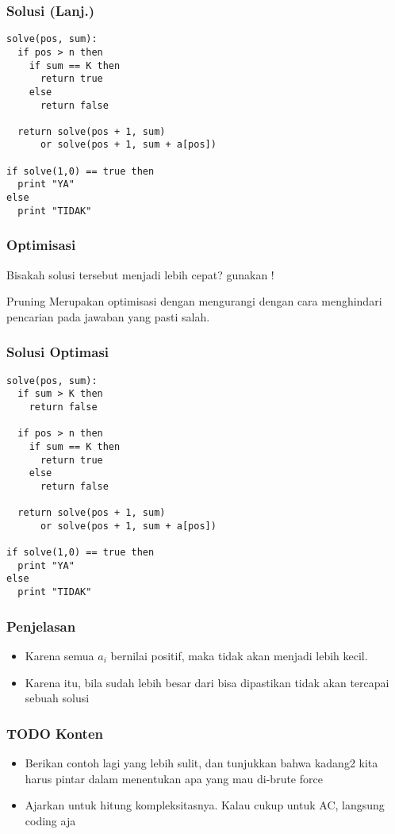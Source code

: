\begin{frame}[fragile]
\frametitle{Solusi (Lanj.)}
\begin{lstlisting}
solve(pos, sum):
  if pos > n then
    if sum == K then
      return true
    else
      return false

  return solve(pos + 1, sum) 
      or solve(pos + 1, sum + a[pos])

if solve(1,0) == true then
  print "YA"
else
  print "TIDAK"
\end{lstlisting}
\end{frame}

\begin{frame}
\frametitle{Optimisasi}
Bisakah solusi tersebut menjadi lebih cepat?
gunakan !

\begin{block}{Pruning}
  Merupakan optimisasi dengan mengurangi  dengan cara menghindari pencarian pada jawaban yang pasti salah.
\end{block}
\end{frame}

\begin{frame}[fragile]
\frametitle{Solusi Optimasi}
\begin{lstlisting}
solve(pos, sum):
  if sum > K then
    return false

  if pos > n then
    if sum == K then
      return true
    else
      return false

  return solve(pos + 1, sum) 
      or solve(pos + 1, sum + a[pos])

if solve(1,0) == true then
  print "YA"
else
  print "TIDAK"
\end{lstlisting}
\end{frame}

\begin{frame}
\frametitle{Penjelasan}
\begin{itemize}
  \item Karena semua $a_i$ bernilai positif, maka  tidak akan menjadi lebih kecil.
  \item Karena itu, bila  sudah lebih besar dari  bisa dipastikan tidak akan tercapai sebuah solusi
\end{itemize}
\end{frame}

\begin{frame}
\frametitle{TODO Konten}
\begin{itemize}
  \item Berikan contoh lagi yang lebih sulit, dan tunjukkan bahwa kadang2 kita harus pintar dalam menentukan apa yang mau di-brute force
  \item Ajarkan untuk hitung kompleksitasnya. Kalau cukup untuk AC, langsung coding aja
\end{itemize}
\end{frame}


